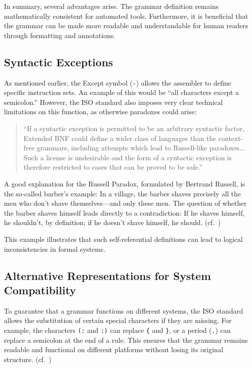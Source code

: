 In summary, several advantages arise. The grammar definition remains mathematically consistent for automated tools. Furthermore, it is beneficial that the grammar can be made more readable and understandable for human readers through formatting and annotations.

\subsection{Syntactic Exceptions}

As mentioned earlier, the Except symbol (\texttt{-}) allows the assembler to define specific instruction sets. An example of this would be ``all characters except a semicolon.'' However, the ISO standard also imposes very clear technical limitations on this function, as otherwise paradoxes could arise:

\begin{quote}
``If a syntactic exception is permitted to be an arbitrary syntactic factor, Extended BNF could define a wider class of languages than the context-free grammars, including attempts which lead to Russell-like paradoxes... Such a license is undesirable and the form of a syntactic exception is therefore restricted to cases that can be proved to be safe.'' \cite[p.~2]{ISO/IEC149771996InformationBNF}
\end{quote}

A good explanation for the Russell Paradox, formulated by Bertrand Russell, is the so-called barber's example: In a village, the barber shaves precisely all the men who don't shave themselves—and only these men. The question of whether the barber shaves himself leads directly to a contradiction: If he shaves himself, he shouldn't, by definition; if he doesn't shave himself, he should. (cf.~\cite{WikipediaBarbierParadoxon})

This example illustrates that such self-referential definitions can lead to logical inconsistencies in formal systems.


\subsection{Alternative Representations for System Compatibility}

To guarantee that a grammar functions on different systems, the ISO standard allows the substitution of certain special characters if they are missing. For example, the characters \texttt{(:} and \texttt{:)} can replace \texttt{\{} and \texttt{\}}, or a period (\texttt{.}) can replace a semicolon at the end of a rule. This ensures that the grammar remains readable and functional on different platforms without losing its original structure.
(cf.~\cite[pp.~5]{ISO/IEC149771996InformationBNF})


